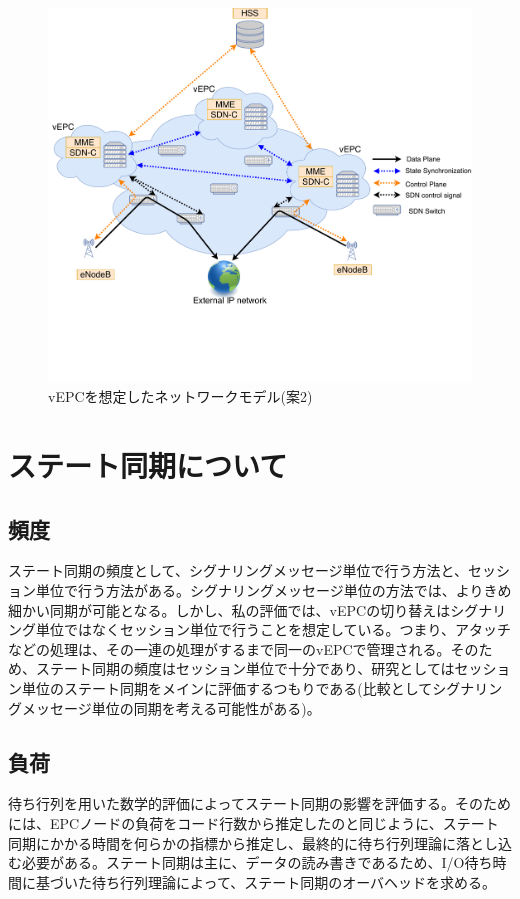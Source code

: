 \documentclass[a4j]{ujarticle}
\begin{document}
\begin{figure}[htbp]
	\centering
	\includegraphics[width=0.7\hsize]{vEPC_SDN_model.pdf}
  \caption{vEPCを想定したネットワークモデル(案2)}
	\label{vEPC_SDN_model}
\end{figure}

\clearpage


\section{ステート同期について}
\subsection{頻度}
ステート同期の頻度として、シグナリングメッセージ単位で行う方法と、セッション単位で行う方法がある。シグナリングメッセージ単位の方法では、よりきめ細かい同期が可能となる。しかし、私の評価では、vEPCの切り替えはシグナリング単位ではなくセッション単位で行うことを想定している。つまり、アタッチなどの処理は、その一連の処理がするまで同一のvEPCで管理される。そのため、ステート同期の頻度はセッション単位で十分であり、研究としてはセッション単位のステート同期をメインに評価するつもりである(比較としてシグナリングメッセージ単位の同期を考える可能性がある)。
\subsection{負荷}
待ち行列を用いた数学的評価によってステート同期の影響を評価する。そのためには、EPCノードの負荷をコード行数から推定したのと同じように、ステート同期にかかる時間を何らかの指標から推定し、最終的に待ち行列理論に落とし込む必要がある。ステート同期は主に、データの読み書きであるため、I/O待ち時間に基づいた待ち行列理論によって、ステート同期のオーバヘッドを求める。
\end{document}
